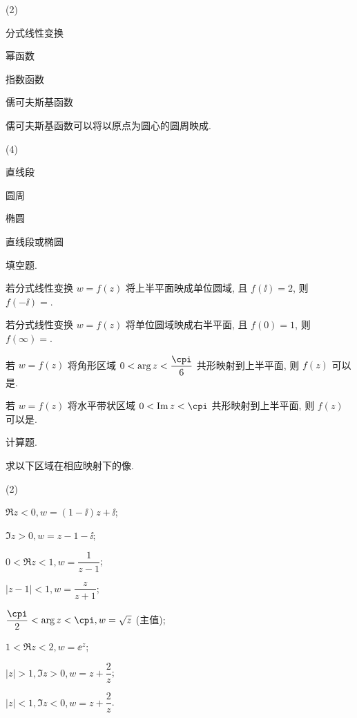 \begin{homework}
\begin{homework}
    \begin{exchoice}(2)
      \item 分式线性变换
      \item 幂函数
      \item 指数函数
      \item 儒可夫斯基函数
    \end{exchoice}
    \item 儒可夫斯基函数可以将以原点为圆心的圆周映成\fillbrace{}.
    \begin{exchoice}(4)
      \item 直线段
      \item 圆周
      \item 椭圆
      \item 直线段或椭圆
    \end{exchoice}
  \end{homework}
  \item 填空题.
  \begin{homework}
    \item 若分式线性变换 $w=f(z)$ 将上半平面映成单位圆域, 且 $f(\ii)=2$, 则 $f(-\ii)=$\fillblank[7mm]{}.
    \item 若分式线性变换 $w=f(z)$ 将单位圆域映成右半平面, 且 $f(0)=1$, 则 $f(\infty)=$\fillblank[7mm]{}.
    \item 若 $w=f(z)$ 将角形区域 $0<\arg z<\dfrac\cpi6$ 共形映射到上半平面, 则 $f(z)$ 可以是\fillblank{}.
    \item 若 $w=f(z)$ 将水平带状区域 $0<\Im z<\cpi$ 共形映射到上半平面, 则 $f(z)$ 可以是\fillblank{}.
  \end{homework}
  \item 计算题.
  \begin{homework}
    \item 求以下区域在相应映射下的像.
    \begin{subhomework}(2)
      \item $\Re z<0, w=(1-\ii)z+\ii$;
      \item $\Im z>0, w=z-1-\ii$;
      \item $0<\Re z<1, w=\dfrac1{z-1}$;
      \item $|z-1|<1, w=\dfrac z{z+1}$;
      \item $\dfrac\cpi2<\arg z<\cpi, w=\sqrt z$ (主值);
      \item $1<\Re z<2, w=\ee^z$;
      \item $|z|>1, \Im z>0, w=z+\dfrac 2z$;
      \item $|z|<1, \Im z<0, w=z+\dfrac 2z$.
    \end{subhomework}

\end{homework}
\end{homework}
